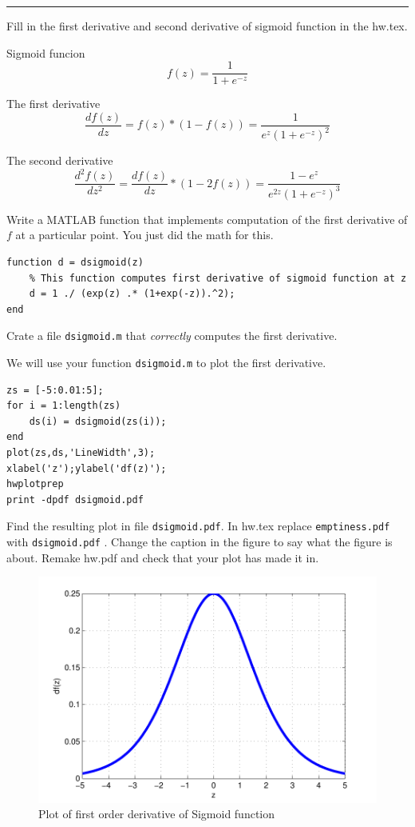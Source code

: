 \documentclass{article}
\begin{document}
\hrule

\newproblem{1pt}
Fill in the first derivative and second derivative of sigmoid function in the hw\theHW.tex.

Sigmoid funcion
\[
f(z) = \frac{1}{1+e^{-z}} 
\]

The first derivative
\[
\frac{d f(z)}{dz} = f(z) * (1 - f(z)) = \frac{1}{e^{z}(1+e^{-z})^{2}}
\]

The second derivative
\[
\frac{d^{2} f(z)}{d{z}^{2}} = \frac{d f(z)}{dz} * (1 - 2f(z)) = \frac{1 - e^{z}}{e^{2z}(1+e^{-z})^{3}}
\]


\newproblem{1pt}
Write a MATLAB function that implements computation  of the first derivative of $f$ at a particular point. You just did the math for this.
\begin{verbatim}
function d = dsigmoid(z)
    % This function computes first derivative of sigmoid function at z
    d = 1 ./ (exp(z) .* (1+exp(-z)).^2);
end
\end{verbatim}

Crate a file {\tt dsigmoid.m} that {\em correctly} computes the first derivative.

\newproblem{1pt}

We will use your function {\tt dsigmoid.m} to plot the first derivative.
\begin{verbatim}
zs = [-5:0.01:5];
for i = 1:length(zs)
    ds(i) = dsigmoid(zs(i));
end
plot(zs,ds,'LineWidth',3);
xlabel('z');ylabel('df(z)');
hwplotprep
print -dpdf dsigmoid.pdf
\end{verbatim}

Find the resulting plot in file {\tt dsigmoid.pdf}. In hw\theHW.tex replace {\tt emptiness.pdf} with {\tt dsigmoid.pdf} . Change the
caption in the figure to say what the figure is about. Remake hw\theHW.pdf and check that your plot has made it in.
\begin{figure}[H]
\begin{center}
\includegraphics[scale=0.5]{dsigmoid.pdf}
\caption{Plot of first order derivative of Sigmoid function}
\end{center}
\end{figure}
\end{document}
